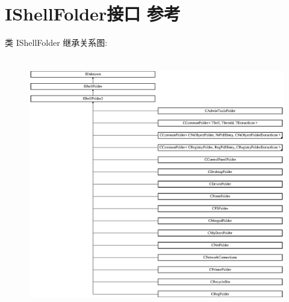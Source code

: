 \hypertarget{interface_i_shell_folder}{}\section{I\+Shell\+Folder接口 参考}
\label{interface_i_shell_folder}
类 I\+Shell\+Folder 继承关系图\+:\begin{figure}[H]
\begin{center}
\leavevmode
\includegraphics[height=11.176470cm]{interface_i_shell_folder}
\end{center}
\end{figure}
